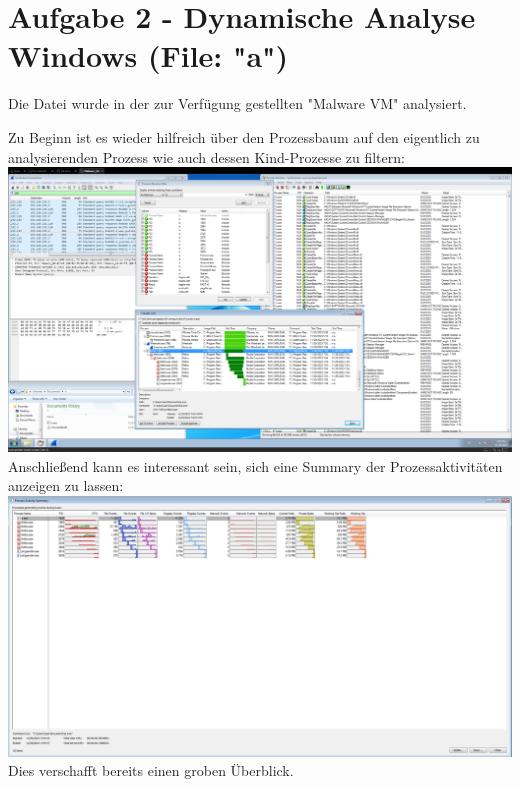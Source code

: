 \documentclass{article}
\begin{document}
	\section*{Aufgabe 2 - Dynamische Analyse Windows (File: "a")}
	\begin{mynote}
		Die Datei wurde in der zur Verfügung gestellten "Malware VM" analysiert.
	\end{mynote}
	Zu Beginn ist es wieder hilfreich über den Prozessbaum auf den eigentlich zu analysierenden Prozess wie auch dessen Kind-Prozesse zu filtern:\\
	\includegraphics[width=1\linewidth]{"pictures/2.1 main"}
	Anschließend kann es interessant sein, sich eine Summary der Prozessaktivitäten anzeigen zu lassen:\\
	\includegraphics[width=1\linewidth]{"pictures/2.1 main2"}
	Dies verschafft bereits einen groben Überblick.
	
	\pagebreak
	
\end{document}

